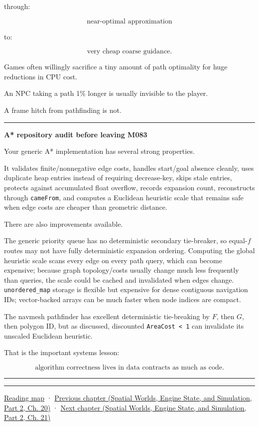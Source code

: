 through:

\[
\text{near-optimal approximation}
\]

to:

\[
\text{very cheap coarse guidance}.
\]

Games often willingly sacrifice a tiny amount of path optimality for huge reductions in CPU cost.

An NPC taking a path 1\% longer is usually invisible to the player.

A frame hitch from pathfinding is not.

\begin{center}\rule{0.5\linewidth}{0.5pt}\end{center}

\textbf{A* repository audit before leaving M083}

Your generic A* implementation has several strong properties.

It validates finite/nonnegative edge costs, handles start/goal absence cleanly, uses duplicate heap entries instead of requiring decrease-key, skips stale entries, protects against accumulated float overflow, records expansion count, reconstructs through \texttt{cameFrom}, and computes a Euclidean heuristic scale that remains safe when edge costs are cheaper than geometric distance.

There are also improvements available.

The generic priority queue has no deterministic secondary tie-breaker, so equal-\(f\) routes may not have fully deterministic expansion ordering. Computing the global heuristic scale scans every edge on every path query, which can become expensive; because graph topology/costs usually change much less frequently than queries, the scale could be cached and invalidated when edges change. \texttt{unordered\_map} storage is flexible but expensive for dense contiguous navigation IDs; vector-backed arrays can be much faster when node indices are compact.

The navmesh pathfinder has excellent deterministic tie-breaking by \(F\), then \(G\), then polygon ID, but as discussed, discounted \texttt{AreaCost\ \textless{}\ 1} can invalidate its unscaled Euclidean heuristic.

That is the important systems lesson:

\[
\boxed{
\text{algorithm correctness lives in data contracts as much as code}.
}
\]

\begin{center}\rule{0.5\linewidth}{0.5pt}\end{center}

\begin{center}\rule{0.5\linewidth}{0.5pt}\end{center}

\hyperref[volume-reading-map]{Reading map} · \href{../05-Spatial-Worlds-Engine-State-and-Simulation-P02/main.pdf\#nameddest=06-engine-ii-ch029-dynamic-spatial-indices-for-moving-worlds}{Previous chapter (Spatial Worlds, Engine State, and Simulation, Part 2, Ch. 20)} · \href{../05-Spatial-Worlds-Engine-State-and-Simulation-P02/main.pdf\#nameddest=06-engine-ii-ch031-spatial-index-serialization-and-query-evidence}{Next chapter (Spatial Worlds, Engine State, and Simulation, Part 2, Ch. 21)}
